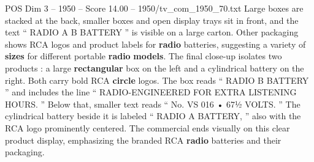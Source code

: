 \begin{textsample}{POS Dim 3 – 1950 – Score 14.00 – 1950/tv\_com\_1950\_70.txt}
Large boxes are stacked at the back, smaller boxes and open display trays sit in front, and the text “ RADIO A B BATTERY ” is visible on a large carton.
Other packaging shows RCA logos and product labels for \textbf{radio} batteries, suggesting a variety of \textbf{sizes} for different portable \textbf{radio} \textbf{models}.
The final close-up isolates two products : a large \textbf{rectangular} box on the left and a cylindrical battery on the right.
Both carry bold RCA \textbf{circle} logos.
The box reads “ RADIO B BATTERY ” and includes the line “ RADIO-ENGINEERED FOR EXTRA LISTENING HOURS. ” Below that, smaller text reads “ No.
VS 016 • 67½ VOLTS. ” The cylindrical battery beside it is labeled “ RADIO A BATTERY, ” also with the RCA logo prominently centered.
The commercial ends visually on this clear product display, emphasizing the branded RCA \textbf{radio} batteries and their packaging.

\end{textsample}
